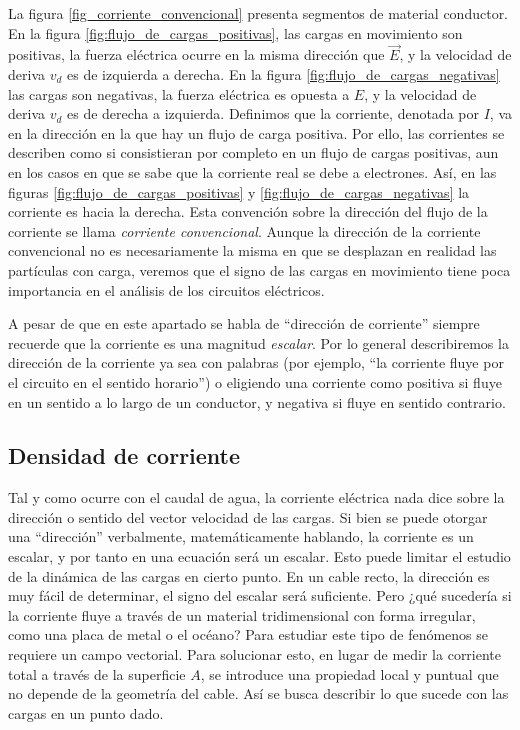 La figura \ref{fig_corriente_convencional} presenta segmentos de material conductor. En la figura \ref{fig:flujo_de_cargas_positivas}, las cargas en movimiento son positivas, la fuerza eléctrica ocurre en la misma dirección que \(\vec{E}\), y la velocidad de deriva \(v_d\) es de izquierda a derecha. En la figura \ref{fig:flujo_de_cargas_negativas} las cargas son negativas, la fuerza eléctrica es opuesta a \(E\), y la velocidad de deriva \(v_d\) es de derecha a izquierda. Definimos que la corriente, denotada por \(I\), va en la dirección en la que hay un flujo de carga positiva. Por ello, las corrientes se describen como si consistieran por completo en un flujo de cargas positivas, aun en los casos en que se sabe que la corriente real se debe a electrones. Así, en las figuras \ref{fig:flujo_de_cargas_positivas} y \ref{fig:flujo_de_cargas_negativas} la corriente es hacia la derecha. Esta convención sobre la dirección del flujo de la corriente se llama \emph{corriente convencional}. Aunque la dirección de la corriente convencional no es necesariamente la misma en que se desplazan en realidad las partículas con carga, veremos que el signo de las cargas en movimiento tiene poca importancia en el análisis de los circuitos eléctricos.



A pesar de que en este apartado se habla de ``dirección de corriente'' siempre recuerde que la corriente es una magnitud \emph{escalar}. Por lo general describiremos la dirección de la corriente ya sea con palabras (por ejemplo, ``la corriente fluye por el circuito en el sentido horario'') o eligiendo una corriente como positiva si fluye en un sentido a lo largo de un conductor, y negativa si fluye en sentido contrario.

\subsection{Densidad de corriente}

Tal y como ocurre con el caudal de agua, la corriente eléctrica nada dice sobre la dirección o sentido del vector velocidad de las cargas. Si bien se puede otorgar una ``dirección'' verbalmente, matemáticamente hablando, la corriente es un escalar, y por tanto en una ecuación será un escalar. Esto puede limitar el estudio de la dinámica de las cargas en cierto punto. En un cable recto, la dirección es muy fácil de determinar, el signo del escalar será suficiente. Pero ¿qué sucedería si la corriente fluye a través de un material tridimensional con forma irregular, como una placa de metal o el océano? Para estudiar este tipo de fenómenos se requiere un campo vectorial. Para solucionar esto, en lugar de medir la corriente total a través de la superficie \(A\), se introduce una propiedad local y puntual que no depende de la geometría del cable. Así se busca describir lo que sucede con las cargas en un punto dado. 


